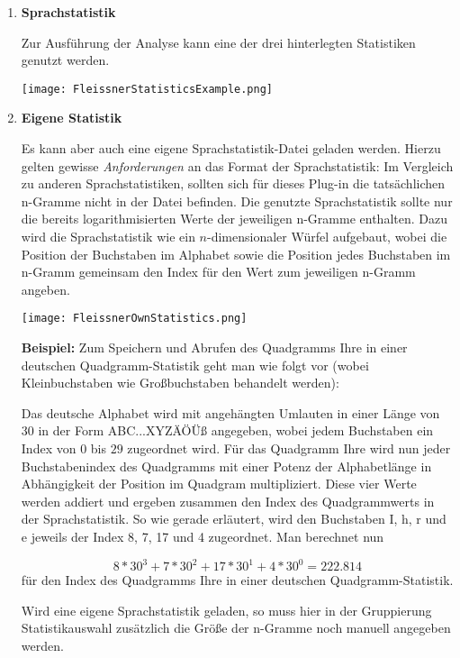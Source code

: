 \documentclass[fontsize=12pt, DIV=15, parskip=half-]{scrartcl}
\theoremstyle{break}
\begin{document}
\begin{enumerate}[label=(\alph*), leftmargin=*]
\item \textbf{Sprachstatistik}

Zur Ausführung der Analyse kann eine der drei hinterlegten Statistiken genutzt werden. 

\texttt{[image: FleissnerStatisticsExample.png]}

\item \textbf{Eigene Statistik}

Es kann aber auch eine eigene Sprachstatistik-Datei geladen werden. Hierzu gelten gewisse \textit{Anforderungen} an das Format der Sprachstatistik:
Im Vergleich zu anderen Sprachstatistiken, sollten sich für dieses Plug-in die tatsächlichen n-Gramme nicht in der Datei befinden. Die genutzte Sprachstatistik sollte nur die bereits logarithmisierten Werte der jeweiligen n-Gramme enthalten. Dazu wird die Sprachstatistik wie ein $n$-dimensionaler Würfel aufgebaut, wobei die Position der Buchstaben im Alphabet sowie die Position jedes Buchstaben im n-Gramm gemeinsam den Index für den Wert zum jeweiligen n-Gramm angeben.

\texttt{[image: FleissnerOwnStatistics.png]}

\textbf{Beispiel:}
Zum Speichern und Abrufen des Quadgramms \glqq Ihre\grqq{} in einer deutschen Quadgramm-Statistik geht man wie folgt vor (wobei Kleinbuchstaben wie Großbuchstaben behandelt werden):

Das deutsche Alphabet wird mit angehängten Umlauten in einer Länge von 30 in der Form \glqq ABC...XYZÄÖÜß\grqq{} angegeben, wobei jedem Buchstaben ein Index von $0$ bis $29$ zugeordnet wird. Für das Quadgramm \glqq Ihre\grqq{} wird nun jeder Buchstabenindex des Quadgramms mit einer Potenz der Alphabetlänge in Abhängigkeit der Position im Quadgram multipliziert. Diese vier Werte werden addiert und ergeben zusammen den Index des Quadgrammwerts in der Sprachstatistik. So wie gerade erläutert, wird den Buchstaben I, h, r und e jeweils der Index 8, 7, 17 und 4 zugeordnet. Man berechnet nun

\[ 
8*30^3 + 7*30^2 + 17* 30^1+4*30^0 = 222.814
\]
für den Index des Quadgramms \glqq Ihre\grqq{} in einer deutschen Quadgramm-Statistik.

Wird eine eigene Sprachstatistik geladen, so muss hier in der Gruppierung \glqq Statistikauswahl\grqq{} zusätzlich die Größe der n-Gramme noch manuell angegeben werden.
\end{enumerate}
\newpage
\end{document}
